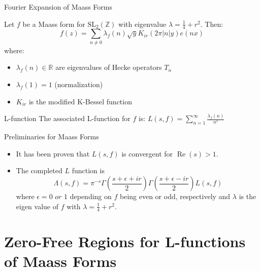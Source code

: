 \documentclass{beamer}
\def\Re{\operatorname{Re}}
\begin{document}
\begin{frame}{Fourier Expansion of Maass Forms}
\begin{theorem}
Let $f$ be a Maass form for $\text{SL}_2(\mathbb{Z})$ with eigenvalue $\lambda = \frac{1}{4} + r^2$. Then:
$$f(z) = \sum_{n \neq 0} \lambda_f(n)\sqrt{y} K_{ir}(2\pi|n|y)e(nx)$$
where:
\begin{itemize}
\item $\lambda_f(n) \in \mathbb{R}$ are eigenvalues of Hecke operators $T_n$
\item $\lambda_f(1) = 1$ (normalization)
\item $K_{ir}$ is the modified K-Bessel function
\end{itemize}
\end{theorem}

\vspace{0.3cm}

\begin{block}{L-function}
The associated L-function  for $f$ is: $L(s,f) = \displaystyle\sum_{n=1}^{\infty} \frac{\lambda_f(n)}{n^s}$
\end{block}
\end{frame}
\begin{frame}{Preliminaries for Maass Forms}
    \begin{itemize}
\item  It has been proven that $L(s,f)$ is convergent for $\Re(s)>1$.
\item The completed $L$ function is \[
\Lambda(s,f) = \pi^{-s} \Gamma\left(\frac{s+\epsilon +ir}{2}\right)\Gamma\left(\frac{s+\epsilon -ir}{2}\right)L(s,f)
\] where $\epsilon = 0 \textit{ or }1$ depending on $f$ being even or odd, respectively and $\lambda$ is the eigen value of $f$ with $\lambda = \frac{1}{4} + r^2$.
\end{itemize}
\end{frame}
\section{Zero-Free Regions for L-functions of Maass Forms}

\end{document}
